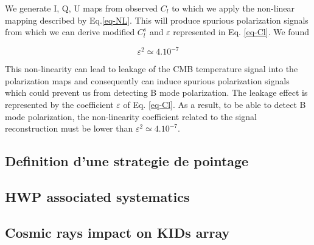 We generate I, Q, U maps from observed $C_{l}$ to which we apply the non-linear mapping described by Eq.\ref{eq-NL}. This will produce spurious polarization signals from which we can derive modified $C_{l}^{s}$ and $\varepsilon$ represented in Eq. \ref{eq-Cl}. We found 

\begin{equation}
\varepsilon^{2} \simeq 4.10^{-7}
\label{epsilon}
\end{equation}

This non-linearity can lead to leakage of the CMB temperature signal into the polarization maps and consequently can induce spurious polarization signals which could prevent us from detecting B mode polarization. The leakage effect is represented by the coefficient $\varepsilon$ of Eq. \ref{eq-Cl}. As a result, to be able to detect B mode polarization, the non-linearity coefficient related to the signal reconstruction must be lower than $\varepsilon^{2} \simeq 4.10^{-7}$.



\subsection{Definition d'une strategie de pointage}

\subsection{HWP associated systematics}


\subsection{Cosmic rays impact on KIDs array}

